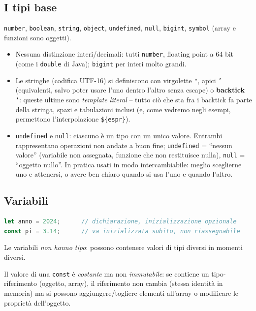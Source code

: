 \subsection{I tipi base}
\texttt{number}, \texttt{boolean}, \texttt{string}, \texttt{object}, \texttt{undefined},
\texttt{null}, \texttt{bigint}, \texttt{symbol} (array e funzioni sono oggetti).
\begin{itemize}
  \item Nessuna distinzione interi/decimali: tutti \texttt{number}, floating point a 64 bit
        (come i \texttt{double} di Java); \texttt{bigint} per interi molto grandi.
  \item Le stringhe (codifica UTF-16) si definiscono con virgolette \texttt{"}, apici
        \texttt{'} (equivalenti, salvo poter usare l'uno dentro l'altro senza escape) o
        \textbf{backtick} \texttt{`}: queste ultime sono \emph{template literal} -- tutto ci\`o
        che sta fra i backtick fa parte della stringa, spazi e tabulazioni inclusi (e, come
        vedremo negli esempi, permettono l'interpolazione \texttt{\$\{espr\}}).
  \item \texttt{undefined} e \texttt{null}: ciascuno \`e un tipo con un unico valore.
        Entrambi rappresentano operazioni non andate a buon fine; \texttt{undefined} =
        ``nessun valore'' (variabile non assegnata, funzione che non restituisce nulla),
        \texttt{null} = ``oggetto nullo''. In pratica usati in modo intercambiabile: meglio
        sceglierne uno e attenersi, o avere ben chiaro quando si usa l'uno e quando l'altro.
\end{itemize}

\subsection{Variabili}
\begin{lstlisting}[language=JavaScript]
let anno = 2024;      // dichiarazione, inizializzazione opzionale
const pi = 3.14;      // va inizializzata subito, non riassegnabile
\end{lstlisting}
Le variabili \emph{non hanno tipo}: possono contenere valori di tipi diversi in momenti
diversi.
\begin{attenzione}
Il valore di una \texttt{const} \`e \emph{costante} ma non \emph{immutabile}: se contiene un
tipo-riferimento (oggetto, array), il riferimento non cambia (stessa identit\`a in memoria) ma
si possono aggiungere/togliere elementi all'array o modificare le propriet\`a dell'oggetto.
\end{attenzione}

